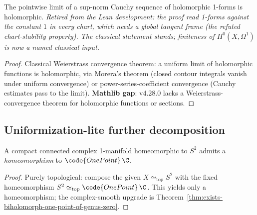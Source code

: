 \begin{lemma}
\label{lem:holomorphic-one-form-limit-holomorphic}
The pointwise limit of a sup-norm Cauchy sequence of holomorphic
1-forms is holomorphic.
\textit{Retired from the Lean development: the proof read 1-forms against the constant
\(1\) in every chart, which needs a global tangent frame (the refuted chart-stability
property). The classical statement stands; finiteness of \(H^0(X,\Omega^1)\) is now a named
classical input.}
\end{lemma}
\begin{proof}\leanok
Classical Weierstrass convergence theorem: a uniform limit of
holomorphic functions is holomorphic, via Morera's theorem (closed
contour integrals vanish under uniform convergence) or
power-series-coefficient convergence (Cauchy estimates pass to the
limit). \textbf{Mathlib gap}: v4.28.0 lacks a Weierstrass-convergence
theorem for holomorphic functions or sections.
\end{proof}

\subsection{Uniformization-lite further decomposition}
\label{sec:uniformization-lite-iter3}

\begin{lemma}
\label{lem:uniformization-genus-zero-homeomorphism}
A compact connected complex 1-manifold homeomorphic to \(S^2\) admits a
\emph{homeomorphism} to \(\code{OnePoint}\,\C\).
\leanok
\end{lemma}
\begin{proof}
\leanok
Purely topological: compose the given \(X\simeq_{\mathrm{top}}S^2\) with the
fixed homeomorphism \(S^2\simeq_{\mathrm{top}}\code{OnePoint}\,\C\). This yields
only a homeomorphism; the complex-smooth upgrade is
Theorem~\ref{thm:exists-biholomorph-one-point-of-genus-zero}.
\end{proof}

